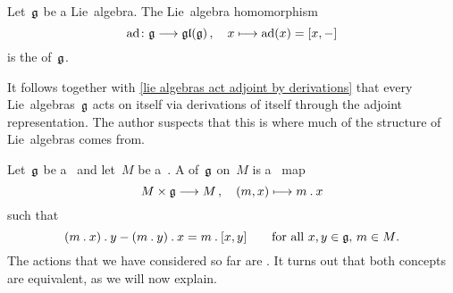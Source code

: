 \begin{definition}
  Let~$\mathfrak{g}$ be a Lie~algebra.
  The  Lie~algebra homomorphism
  \[
    \ad
    \colon
    \glie
    \to
    \gllie(\glie) \,,
    \quad
    x
    \mapsto
    \ad(x)
    =
    [x,-]
  \]
  is the  of~$\mathfrak{g}$.
\end{definition}


\begin{remark}
  It follows together with \cref{lie algebras act adjoint by derivations} that every Lie~algebras~$\mathfrak{g}$ acts on itself via derivations of itself through the adjoint representation.
  The author suspects that this is where much of the structure of Lie~algebras comes from.
\end{remark}


\begin{remark}
  \label{right representations}
  Let~$\mathfrak{g}$ be a~{\liealgebra{$\kf$}} and let~$M$ be a~\vectorspace{$\kf$}.
  A  of~$\mathfrak{g}$ on~$M$ is a~{\bilinear{$\kf$}} map
  \[
    M \times \glie
    \to
    M \,,
    \quad
    (m,x)
    \mapsto
    m \act x
  \]
  such that
  \begin{equation}
    \label{right action}
    (m \mathbin{.} x) \mathbin{.} y - (m \mathbin{.} y) \mathbin{.} x
    =
    m \mathbin{.} [x,y]
    \qquad
    \text{for all~$x, y \in \mathfrak{g}$,~$m \in M$.}
  \end{equation}
  The actions that we have considered so far are .
  It turns out that both concepts are equivalent, as we will now explain.


\end{remark}
